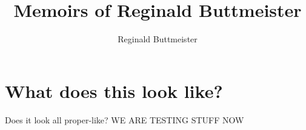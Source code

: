 \documentclass[12pt]{article}
\title{Memoirs of Reginald Buttmeister}
\author{Reginald Buttmeister}
\begin{document}
\maketitle

\section{What does this look like?}
Does it look all proper-like?
\newpage
WE ARE TESTING STUFF NOW 
\end{document}
